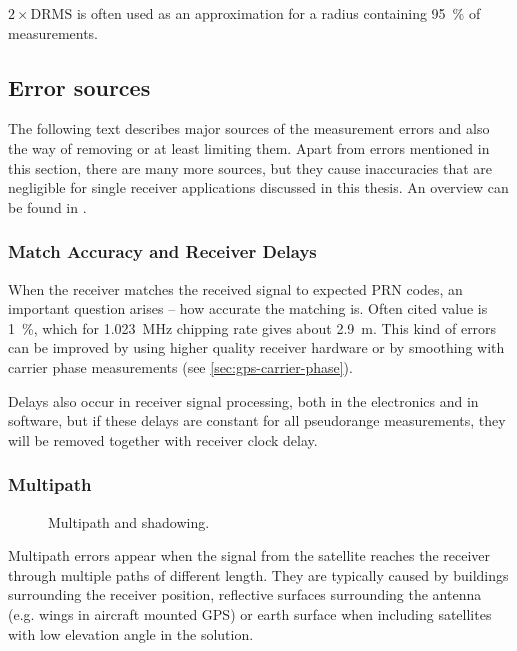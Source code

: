 \(2 \times \mathrm{DRMS}\) is often used as an approximation for a radius containing
\SI{95}{\percent} of measurements.

\subsection{Error sources}

The following text describes major sources of the measurement errors and also the way
of removing or at least limiting them.
Apart from errors mentioned in this section, there are many more sources, but they cause inaccuracies
that are negligible for single receiver applications discussed in this thesis.
An overview can be found in \cite{kouba09}.

\subsubsection{Match Accuracy and Receiver Delays}

When the receiver matches the received signal to expected PRN codes, an
important question arises -- how accurate the matching is.
Often cited value is \SI{1}{\percent}, which for \SI{1.023}{\mega\hertz}
chipping rate gives about \SI{2.9}{\meter}.
This kind of errors can be improved by using higher quality receiver hardware
or by smoothing with carrier phase measurements (see \cref{sec:gps-carrier-phase}).

Delays also occur in receiver signal processing, both in the electronics and in software,
but if these delays are constant for all pseudorange measurements, they will be removed
together with receiver clock delay.

\subsubsection{Multipath}

\begin{figure}[t]
	\centering
	
	\caption{Multipath and shadowing.}
	\label{fig:multipath}
\end{figure}

Multipath errors appear when the signal from the satellite reaches the receiver
through multiple paths of different length.
They are typically caused by buildings surrounding the receiver position,
reflective surfaces surrounding the antenna (e.g. wings in aircraft mounted GPS) or earth surface
when including satellites with low elevation angle in the solution.

